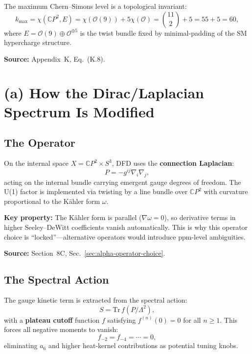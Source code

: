 \documentclass[12pt,a4paper]{article}
\begin{document}
The maximum Chern--Simons level is a topological invariant:
\begin{equation}
k_{\max} = \chi(\mathbb{C}P^2, E) = \chi(\mathcal{O}(9)) + 5\chi(\mathcal{O})
= \binom{11}{2} + 5 = 55 + 5 = 60,
\end{equation}
where $E = \mathcal{O}(9) \oplus \mathcal{O}^{\oplus 5}$ is the twist bundle
fixed by minimal-padding of the SM hypercharge structure.

\textbf{Source:} Appendix~K, Eq.~(K.8).

\section{(a) How the Dirac/Laplacian Spectrum Is Modified}
\label{sec:spectrum}

\subsection{The Operator}

On the internal space $X = \mathbb{C}P^2 \times S^3$, DFD uses the
\textbf{connection Laplacian}:
\begin{equation}
P = -g^{ij}\nabla_i\nabla_j,
\end{equation}
acting on the internal bundle carrying emergent gauge degrees of freedom.
The U(1) factor is implemented via twisting by a line bundle over
$\mathbb{C}P^2$ with curvature proportional to the K\"ahler form $\omega$.

\textbf{Key property:} The K\"ahler form is parallel ($\nabla\omega = 0$),
so derivative terms in higher Seeley--DeWitt coefficients vanish automatically.
This is why this operator choice is ``locked''---alternative operators would
introduce ppm-level ambiguities.

\textbf{Source:} Section~8C, Sec.~\ref*{sec:alpha-operator-choice}.

\subsection{The Spectral Action}

The gauge kinetic term is extracted from the spectral action:
\begin{equation}
S = \mathrm{Tr}\, f(P/\Lambda^2),
\end{equation}
with a \textbf{plateau cutoff} function $f$ satisfying $f^{(n)}(0) = 0$ for
all $n \geq 1$. This forces all negative moments to vanish:
\begin{equation}
f_{-2} = f_{-4} = \cdots = 0,
\end{equation}
eliminating $a_6$ and higher heat-kernel contributions as potential tuning knobs.
\end{document}
